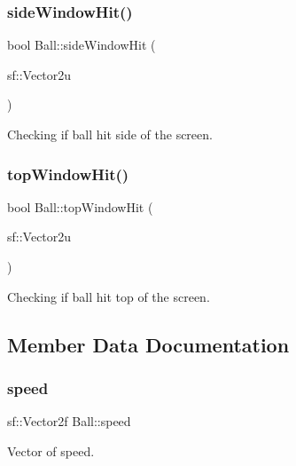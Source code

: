 \mbox{\label{class_ball_add304c78bcbb5067844d71cb16fc29be}} 
\subsubsection{\texorpdfstring{sideWindowHit()}{sideWindowHit()}}
{\footnotesize\ttfamily bool Ball\+::side\+Window\+Hit (\begin{DoxyParamCaption}\item[{sf\+::\+Vector2u}]{ }\end{DoxyParamCaption})}



Checking if ball hit side of the screen. 

\mbox{\label{class_ball_a5e57d9e1b688dc45f6111d7f52b89ccf}} 
\subsubsection{\texorpdfstring{topWindowHit()}{topWindowHit()}}
{\footnotesize\ttfamily bool Ball\+::top\+Window\+Hit (\begin{DoxyParamCaption}\item[{sf\+::\+Vector2u}]{ }\end{DoxyParamCaption})}



Checking if ball hit top of the screen. 



\subsection{Member Data Documentation}
\mbox{\label{class_ball_a827972a1eab3ea7f878b7c86201a674d}} 
\subsubsection{\texorpdfstring{speed}{speed}}
{\footnotesize\ttfamily sf\+::\+Vector2f Ball\+::speed\hspace{0.3cm}{\ttfamily [private]}}



Vector of speed. 

